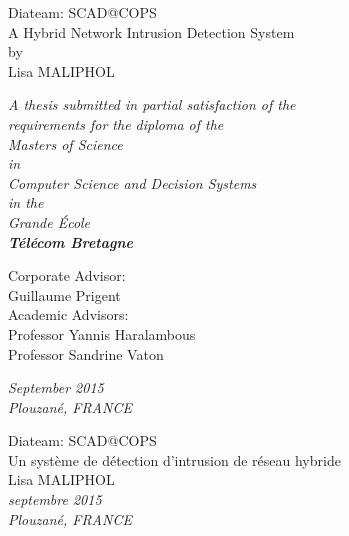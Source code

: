 \documentclass[11pt,]{article}
\begin{document}
\begin{center}

\vspace{30mm}

{\Huge Diateam: SCAD@COPS}\\
\bigskip
{\Huge A Hybrid Network Intrusion Detection System}\\
\vspace{25mm}
{\Large by}\\
\vspace{10mm}
{\huge Lisa MALIPHOL}\\

\vspace{25mm}

\textit{A thesis submitted in partial satisfaction of the}\\
\medskip
\textit{requirements for the diploma of the}\\
\medskip
\textit{Masters of Science}\\
\medskip
\textit{in}\\
\medskip
\textit{Computer Science and Decision Systems}\\
\medskip
\textit{in the}\\
\medskip
\textit{Grande École}\\
\medskip
\textbf{\textit{\Large Télécom Bretagne}}\\

\vspace{25mm}

Corporate Advisor:\\
\smallskip
Guillaume Prigent\\
\bigskip
\medskip
Academic Advisors:\\
\smallskip
Professor Yannis Haralambous\\
Professor Sandrine Vaton\\

\vspace{15mm}

\textit{September 2015}\\
\medskip
\textit{Plouzané, FRANCE}\\

\end{center}

\thispagestyle{empty} \newpage
\mbox{} \thispagestyle{empty}

\newpage

\begin{center}

\vspace{30mm}

{\Huge Diateam: SCAD@COPS}\\
\bigskip
{\Huge Un système de détection d’intrusion de réseau hybride}\\

\vspace{30mm}
{\huge Lisa MALIPHOL}\\

\vspace{75mm}
\textit{septembre 2015}\\
\medskip
\textit{Plouzané, FRANCE}\\

\end{center}
\end{document}
